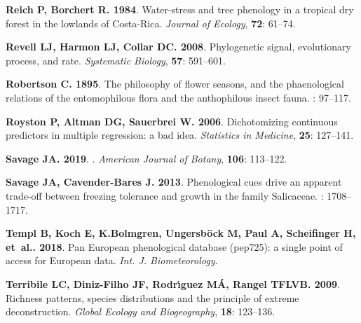 \documentclass[11pt]{article}
\begin{document}
\begin{thebibliography}{39}
{
{\bf Reich P, Borchert R}{\bf . {1984}}.
\newblock Water-stress and tree phenology in a tropical dry forest in the
  lowlands of Costa-Rica.
\newblock \emph{{Journal of Ecology}}, {\bf {72}}: {61--74}.

{\bf Revell LJ, Harmon LJ, Collar DC}{\bf . 2008}.
\newblock Phylogenetic signal, evolutionary process, and rate.
\newblock \emph{Systematic Biology}, {\bf 57}: 591--601.

{\bf Robertson C}{\bf . 1895}.
\newblock The philosophy of flower seasons, and the phaenological relations of
  the entomophilous flora and the anthophilous insect fauna.
: 97--117.

{\bf Royston P, Altman DG, Sauerbrei W}{\bf . 2006}.
\newblock Dichotomizing continuous predictors in multiple regression: a bad
  idea.
\newblock \emph{Statistics in Medicine}, {\bf 25}: 127--141.

{\bf Savage JA}{\bf . {2019}}.
.
\newblock \emph{{American Journal of Botany}}, {\bf {106}}: {113--122}.

{\bf Savage JA, Cavender-Bares J}{\bf . 2013}.
\newblock Phenological cues drive an apparent trade-off between freezing
  tolerance and growth in the family Salicaceae.
: 1708--1717.

{\bf Templ B, Koch E, K.Bolmgren, Ungersb{\"o}ck M, Paul A, Scheifinger H,
  et~al.}{\bf . 2018}.
\newblock Pan European phenological database (pep725): a single point of access
  for European data.
\newblock \emph{Int. J. Biometeorology}.

{\bf Terribile LC, Diniz-Filho JF, Rodr{\'\i}guez M{\'A}, Rangel TFLVB}{\bf .
  2009}.
\newblock Richness patterns, species distributions and the principle of extreme
  deconstruction.
\newblock \emph{Global Ecology and Biogeography}, {\bf 18}: 123--136.

}
\end{thebibliography}
\end{document}
